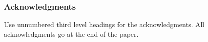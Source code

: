 \documentclass{article}
\newcommand{\GNP}[1][\psi]{{#1}_{\Theta}}
\begin{document}

\subsubsection*{Acknowledgments}

Use unnumbered third level headings for the acknowledgments. All
acknowledgments go at the end of the paper.
\end{document}
